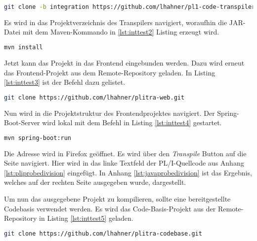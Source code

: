\begin{lstlisting}[language=Bash, caption=Klonen des Transpilers, label={lst:inttest1}]
git clone -b integration https://github.com/lhahner/pl1-code-transpiler.git
\end{lstlisting} 

Es wird in das Projektverzeichnis des Transpilers navigiert, woraufhin die JAR-Datei mit dem Maven-Kommando in \ref{lst:inttest2} Listing erzeugt wird.

\begin{lstlisting}[language=Bash, caption=Erzeugen der JAR, label={lst:inttest2}]
mvn install
\end{lstlisting}

Jetzt kann das Projekt in das Frontend eingebunden werden. Dazu wird erneut das Frontend-Projekt aus dem Remote-Repository geladen. In Listing \ref{lst:inttest3} ist der Befehl dazu gelistet.

\begin{lstlisting}[language=Bash, caption=Klonen des Frontend-Projekts, label={lst:inttest3}]
git clone https://github.com/lhahner/plitra-web.git
\end{lstlisting}

Nun wird in die Projektstruktur des Frontendprojektes navigiert. Der Spring-Boot-Server wird lokal mit dem Befehl in Listing \ref{lst:inttest4} gestartet.

\begin{lstlisting}[language=Bash, caption=Starten des Spring-Boot-Servers, label={lst:inttest4}]
mvn spring-boot:run
\end{lstlisting}

Die Adresse  wird in Firefox geöffnet. Es wird über den \emph{Transpile} Button auf die Seite  navigiert. Hier wird in das linke Textfeld der PL/I-Quellcode aus Anhang \ref{lst:pliprobedivision} eingefügt. In Anhang \ref{lst:javaprobedivision} ist das Ergebnis, welches auf der rechten Seite ausgegeben wurde, dargestellt.

Um nun das ausgegebene Projekt zu kompilieren, sollte eine bereitgestellte Codebasis verwendet werden. Es wird das Code-Basis-Projekt aus der Remote-Repository in Listing \ref{lst:inttest5} geladen.

\begin{lstlisting}[language=Bash, caption=Klonen der Codebasis, label={lst:inttest5}]
git clone https://github.com/lhahner/plitra-codebase.git
\end{lstlisting}

